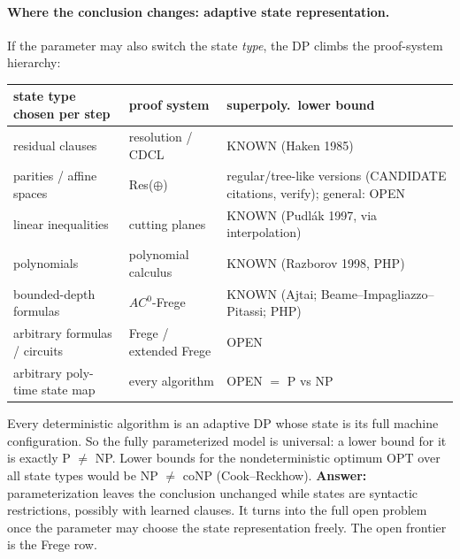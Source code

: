 \documentclass[11pt]{article}
\begin{document}
\paragraph{Where the conclusion changes: adaptive state representation.}
If the parameter may also switch the state \emph{type}, the DP climbs the proof-system hierarchy:
\begin{center}\begin{tabular}{@{}lll@{}}\toprule
state type chosen per step & proof system & superpoly.\ lower bound\\\midrule
residual clauses & resolution / CDCL & KNOWN (Haken 1985)\\
parities / affine spaces & Res($\oplus$) & regular/tree-like versions (CANDIDATE citations, verify); general: OPEN\\
linear inequalities & cutting planes & KNOWN (Pudl\'ak 1997, via interpolation)\\
polynomials & polynomial calculus & KNOWN (Razborov 1998, PHP)\\
bounded-depth formulas & $AC^0$-Frege & KNOWN (Ajtai; Beame--Impagliazzo--Pitassi; PHP)\\
arbitrary formulas / circuits & Frege / extended Frege & OPEN\\
arbitrary poly-time state map & every algorithm & OPEN $=$ P vs NP\\\bottomrule
\end{tabular}\end{center}
Every deterministic algorithm is an adaptive DP whose state is its full machine configuration.
So the fully parameterized model is universal: a lower bound for it is exactly P $\ne$ NP.
Lower bounds for the nondeterministic optimum $\mathrm{OPT}$ over all state types would be
NP $\ne$ coNP (Cook--Reckhow). \textbf{Answer:} parameterization leaves the conclusion unchanged
while states are syntactic restrictions, possibly with learned clauses. It turns into the full open problem once the
parameter may choose the state representation freely. The open frontier is the
Frege row.
\end{document}
